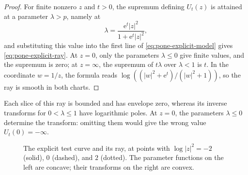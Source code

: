 \begin{proof}
For finite nonzero $z$ and $t>0$, the supremum defining $U_t(z)$ is attained at a parameter $\lambda>p$, namely at
\[
 \lambda=\frac{\mathrm{e}^t|z|^2}{1+\mathrm{e}^t|z|^2},
\]
and substituting this value into the first line of \eqref{eq:pone-explicit-model} gives \eqref{eq:pone-explicit-ray}. At $z=0$, only the parameters $\lambda\leq0$ give finite values, and the supremum is zero; at $z=\infty$, the supremum of $t\lambda$ over $\lambda<1$ is $t$. In the coordinate $w=1/z$, the formula reads $\log((|w|^2+\mathrm e^t)/(|w|^2+1))$, so the ray is smooth in both charts.
\end{proof}

Each slice of this ray is bounded and has envelope zero, whereas its inverse transforms for $0<\lambda\leq1$ have logarithmic poles. At $z=0$, the parameters $\lambda\leq0$ determine the transform: omitting them would give the wrong value $U_t(0)=-\infty$.

\begin{figure}[htbp]
\centering
\resizebox{0.94\textwidth}{!}{}
\caption{The explicit test curve and its ray, at points with $\log|z|^2=-2$ (solid), $0$ (dashed), and $2$ (dotted). The parameter functions on the left are concave; their transforms on the right are convex.}
\label{fig:explicit-legendre-pone}
\end{figure}
